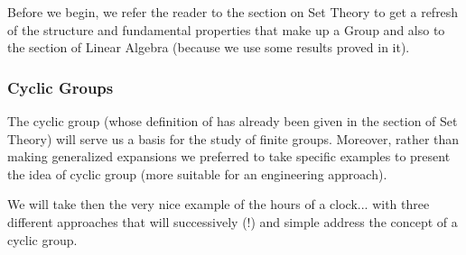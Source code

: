 	Before we begin, we refer the reader to the section on Set Theory to get a refresh of the structure and fundamental properties that make up a Group and also to the section of Linear Algebra (because we use some results proved in it).
	
	\subsubsection{Cyclic Groups}\label{cyclic groups}
	The cyclic group (whose definition of has already been given in the section of Set Theory) will serve us a basis for the study of finite groups. Moreover, rather than making generalized expansions we preferred to take specific examples to present the idea of cyclic group (more suitable for an engineering approach).
	
	We will take then the very nice example of the hours of a clock... with three different approaches that will successively (!) and simple address the concept of a cyclic group.
